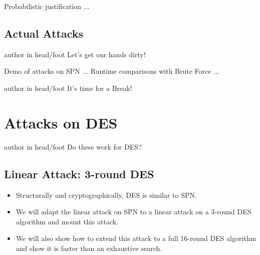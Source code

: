 \documentclass[9pt]{beamer}
\begin{document}
\begin{frame}
Probabilistic justification ...

\end{frame}

\subsection{Actual Attacks}
\begin{frame}
\begin{beamercolorbox}[ht=2.5ex,dp=1.125ex,center,rounded=true,shadow=true]{author in head/foot}
Let's get our hands dirty!
\end{beamercolorbox}
\end{frame}

\begin{frame}
Demo of attacks on SPN ... Runtime comparisons with Brute Force ...

\end{frame}

\begin{frame}
\begin{beamercolorbox}[ht=2.5ex,dp=1.125ex,center,rounded=true,shadow=true]{author in head/foot}
It's time for a Break!
\end{beamercolorbox}
\end{frame}


\section{Attacks on DES}
\begin{frame}
\begin{beamercolorbox}[ht=2.5ex,dp=1.125ex,center,rounded=true,shadow=true]{author in head/foot}
Do these work for DES?
\end{beamercolorbox}
\end{frame}

\subsection{Linear Attack: 3-round DES}
\begin{frame}
\begin{itemize}
\item{Structurally and cryptographically, DES is similar to SPN.}
\item{We will adapt the linear attack on SPN to a linear attack on a 3-round DES algorithm and mount this attack.}
\item{We will also show how to extend this attack to a full 16-round DES algorithm and show it is faster than an exhaustive search.}
\end{itemize}
\end{frame}
\end{document}
